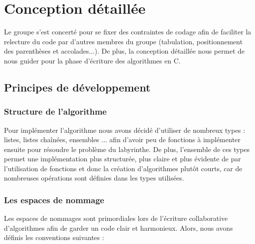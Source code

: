\chapter{Conception détaillée}


    Le groupe s'est concerté pour se fixer des contraintes de codage afin de faciliter la relecture du code par d'autres membres du groupe (tabulation, positionnement des parenthèses et accolades...). De plus, la conception détaillée nous permet de nous guider pour la phase d'écriture des algorithmes en C.
    \vspace{0.5mm}

    \section{Principes de développement}
        \subsection{Structure de l'algorithme}
            Pour implémenter l'algorithme nous avons décidé d'utiliser de nombreux types : listes, listes chaînées, ensembles ... afin d'avoir peu de fonctions à implémenter ensuite pour résoudre le problème du labyrinthe. De plus, l'ensemble de ces types permet une implémentation plus structurée, plus claire et plus évidente de par l'utilisation de fonctions et donc la création d'algorithmes plutôt courts, car de nombreuses opérations sont définies dans les types utilisées.

        \subsection{Les espaces de nommage}
            Les espaces de nommages sont primordiales lors de l'écriture collaborative d'algorithmes afin de garder un code clair et harmonieux. Alors, nous avons définis les conventions suivantes : 

